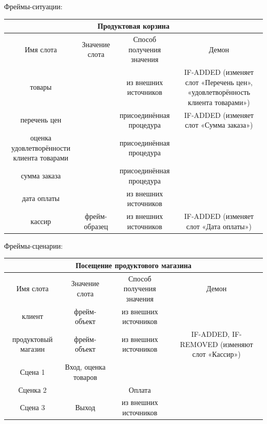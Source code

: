 \documentclass[14pt, a4paper, titlepage]{extarticle}
\begin{document}
Фреймы-ситуации:
\begin{table}[H]
	\begin{adjustbox}{width=\columnwidth,center}
		\begin{tabular}{cccc}
			\toprule
			\multicolumn{4}{c}{Продуктовая корзина} \\
			\midrule
			Имя слота & Значение слота & Способ получения значения & Демон
			\\\midrule
			
			товары & & из внешних источников & IF-ADDED (изменяет слот «Перечень цен», «удовлетворённость клиента товарами») \\
			перечень цен &  & присоединённая процедура & IF-ADDED (изменяет слот «Сумма заказа») \\
			оценка удовлетворённости клиента товарами &  & присоединённая процедура & \\
			сумма заказа & & присоединённая процедура & \\
			дата оплаты & & из внешних источников & \\
			кассир & фрейм-образец & из внешних источников & IF-ADDED (изменяет слот «Дата оплаты»)\\
			
			\bottomrule
		\end{tabular}
	\end{adjustbox}
\end{table}

Фреймы-сценарии:

\begin{table}[H]
	\begin{adjustbox}{width=\columnwidth,center}
		\begin{tabular}{cccc}
			\toprule
			\multicolumn{4}{c}{Посещение продуктового магазина} \\
			\midrule
			Имя слота & Значение слота & Способ получения значения & Демон
			\\\midrule
			
			клиент & фрейм-объект & из внешних источников & \\
			продуктовый магазин & фрейм-объект & из внешних источников & IF-ADDED, IF-REMOVED (изменяют слот «Кассир») \\
			Сцена 1 & Вход, оценка товаров &  & \\
			Сценка 2 & & Оплата & \\
			Сцена 3 & Выход & из внешних источников & \\
			
			\bottomrule
		\end{tabular}
	\end{adjustbox}
\end{table}
\end{document}
